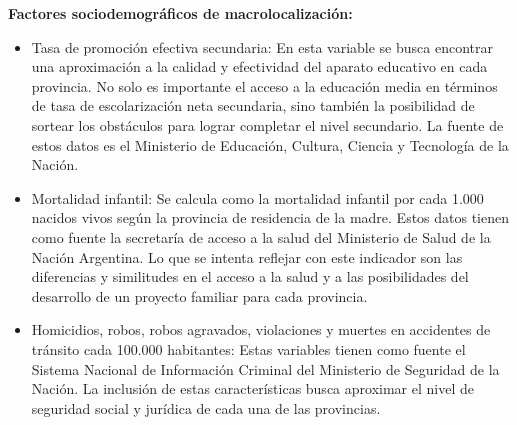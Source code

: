 \documentclass[12pt,a4paper]{article}
\begin{document}
\textbf{Factores sociodemográficos de macrolocalización:}
\begin{itemize}

\item Tasa de promoción efectiva secundaria: En esta variable se busca encontrar una aproximación a la calidad y efectividad del aparato educativo en cada provincia. No solo es importante el acceso a la educación media en términos de tasa de escolarización neta secundaria, sino también la posibilidad de sortear los obstáculos para lograr completar el nivel secundario. La fuente de estos datos es el Ministerio de Educación, Cultura, Ciencia y Tecnología de la Nación.

\item Mortalidad infantil: Se calcula como la mortalidad infantil por cada 1.000 nacidos vivos según la provincia de residencia de la madre. Estos datos tienen como fuente la secretaría de acceso a la salud del Ministerio de Salud de la Nación Argentina. Lo que se intenta reflejar con este indicador son las diferencias y similitudes en el acceso a la salud y a las posibilidades del desarrollo de un proyecto familiar para cada provincia.

\item Homicidios, robos, robos agravados, violaciones y muertes en accidentes de tránsito cada 100.000 habitantes: Estas variables tienen como fuente el Sistema Nacional de Información Criminal del Ministerio de Seguridad de la Nación. La inclusión de estas características busca aproximar el nivel de seguridad social y jurídica de cada una de las provincias. 
\end{itemize}
\end{document}
